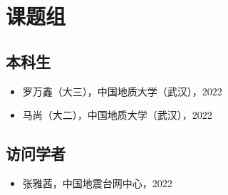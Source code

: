 \section{课题组}

\subsection{本科生}
\begin{itemize}
\item 罗万鑫（大三），中国地质大学（武汉），2022
\item 马尚（大二），中国地质大学（武汉），2022
\end{itemize}

\subsection{访问学者}
\begin{itemize}
\item 张雅茜，中国地震台网中心，2022
\end{itemize}
